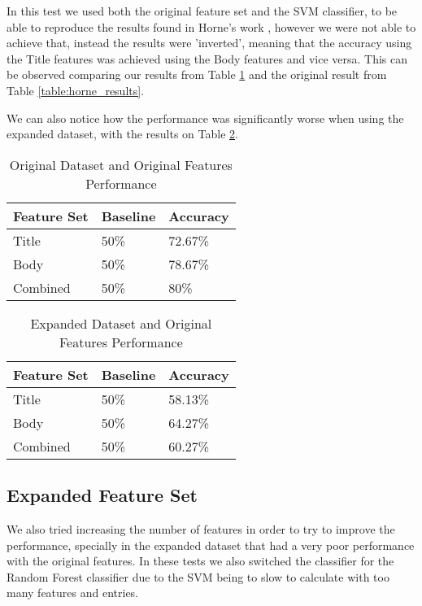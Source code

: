 \documentclass[conference]{IEEEtran}
\begin{document}
In this test we used both the original feature set and the SVM classifier, to be able to reproduce the results
found in Horne's work \cite{horne_2017}, however we were not able to achieve that, instead the results were
'inverted', meaning that the accuracy using the Title features was achieved using the Body features and vice versa.
This can be observed comparing our results from Table \ref{table:od_of} and the original result from Table \ref{table:horne_results}.

We can also notice how the performance was significantly worse when using the expanded dataset, with the results
on Table \ref{table:ed_of}.

\begin{table}[htbp]
\caption{Original Dataset and Original Features Performance}
\begin{center}
\begin{tabular}{ |l|l|l| }
\hline
Feature Set & Baseline & Accuracy \\
\hline
Title & 50\% & 72.67\% \\
\hline
Body & 50\% & 78.67\% \\
\hline
Combined & 50\% & 80\% \\
\hline
\end{tabular}
\label{table:od_of}
\end{center}
\end{table}

\begin{table}[htbp]
\caption{Expanded Dataset and Original Features Performance}
\begin{center}
\begin{tabular}{ |l|l|l| }
\hline
Feature Set & Baseline & Accuracy \\
\hline
Title & 50\% & 58.13\% \\
\hline
Body & 50\% & 64.27\% \\
\hline
Combined & 50\% & 60.27\% \\
\hline
\end{tabular}
\label{table:ed_of}
\end{center}
\end{table}

\subsection{Expanded Feature Set}

We also tried increasing the number of features in order to try to improve the performance,
specially in the expanded dataset that had a very poor performance with the original features.
In these tests we also switched the classifier for the Random Forest classifier due to the
SVM being to slow to calculate with too many features and entries.
\end{document}
